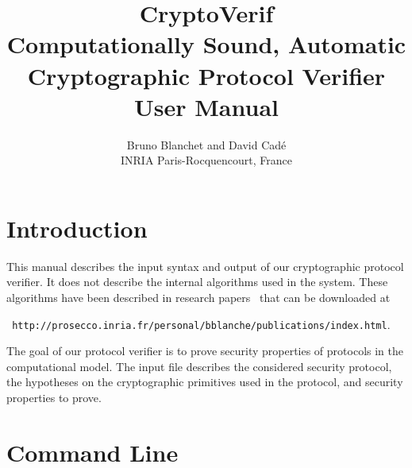 \documentclass{article}
\begin{document}
\title{CryptoVerif\\
Computationally Sound, Automatic\\
Cryptographic Protocol Verifier\\
User Manual}

\author{Bruno Blanchet and David Cad{\'e}\\
INRIA Paris-Rocquencourt, France}

\maketitle

\tableofcontents

\section{Introduction}

This manual describes the input syntax and output of our cryptographic
protocol verifier. It does not describe the internal algorithms used
in the system. These algorithms have been described in research
papers~\cite{Blanchet06,BlanchetEPrint05,Blanchet06b,BlanchetPointchevalEPrint06}
that can be downloaded at

\centerline{{\tt
http://prosecco.inria.fr/personal/bblanche/publications/index.html}.}

The goal of our protocol verifier is to prove security properties
of protocols in the computational model. The input file describes
the considered security protocol, the hypotheses on the cryptographic
primitives used in the protocol, and security properties to prove.

\section{Command Line}
\end{document}

